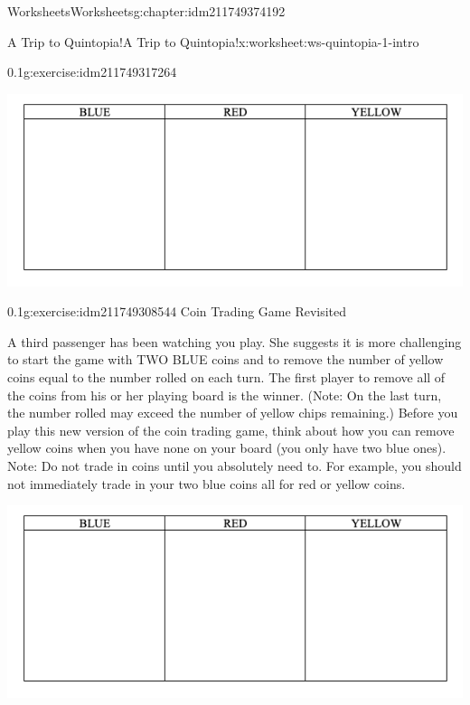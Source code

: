 \documentclass[twoside,11pt,]{book}
\begin{document}
\begin{chapterptx}{Worksheets}{}{Worksheets}{}{}{g:chapter:idm211749374192}
\begin{worksheet-section-numberless}{A Trip to Quintopia!}{}{A Trip to Quintopia!}{}{}{x:worksheet:ws-quintopia-1-intro}
\begin{divisionexercise}{1}{}{0.1}{g:exercise:idm211749317264}
\begin{sidebyside}{1}{0}{0}{0}
\begin{sbspanel}{1}
\includegraphics[width=1\linewidth]{images/quintopia-table.png}
\end{sbspanel}%
\end{sidebyside}%
\end{divisionexercise}%
\clearpage
\begin{divisionexercise}{2}{}{0.1}{g:exercise:idm211749308544}%
Coin Trading Game Revisited%
\par
A third passenger has been watching you play.  She suggests it is more challenging to start the game with TWO BLUE coins and to remove the number of yellow coins equal to the number rolled on each turn.  The first player to remove all of the coins from his or her playing board is the winner.  (Note: On the last turn, the number rolled may exceed the number of yellow chips remaining.)  Before you play this new version of the coin trading game, think about how you can remove yellow coins when you have none on your board (you only have two blue ones).  Note: Do not trade in coins until you absolutely need to.  For example, you should not immediately trade in your two blue coins all for red or yellow coins.%
\begin{sidebyside}{1}{0}{0}{0}%
\begin{sbspanel}{1}%
\includegraphics[width=1\linewidth]{images/quintopia-table.png}
\end{sbspanel}%
\end{sidebyside}%
%
\begin{description}

\end{description}
\end{divisionexercise}
\end{worksheet-section-numberless}
\end{chapterptx}
\end{document}
